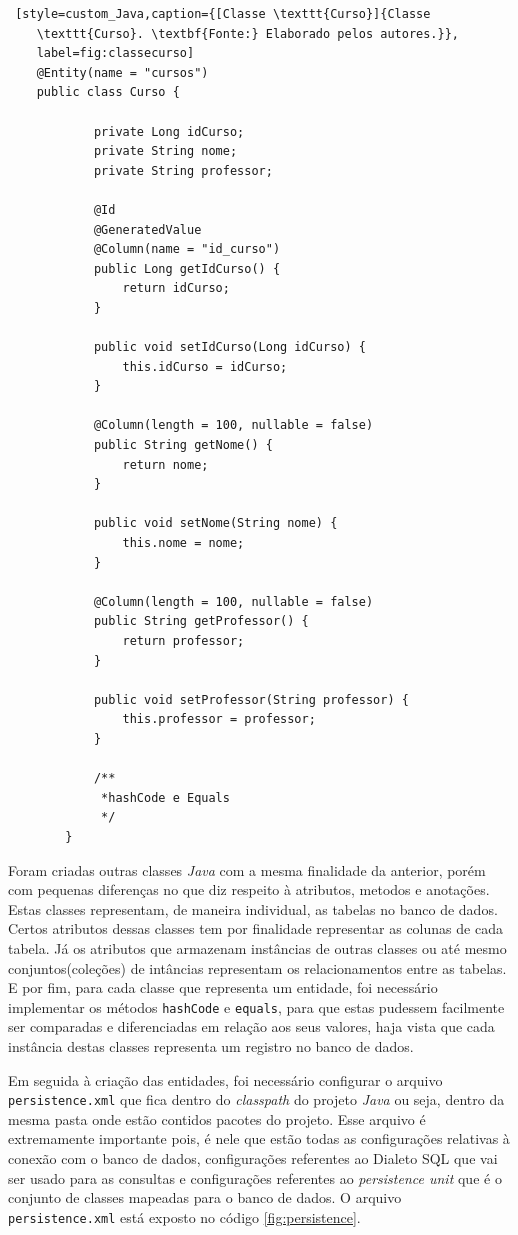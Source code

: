 	\begin{lstlisting} [style=custom_Java,caption={[Classe \texttt{Curso}]{Classe
	\texttt{Curso}. \textbf{Fonte:} Elaborado pelos autores.}},
	label=fig:classecurso] 
	@Entity(name = "cursos") 
	public class Curso {

			private Long idCurso;
			private String nome;
			private String professor;
		
			@Id
			@GeneratedValue
			@Column(name = "id_curso")
			public Long getIdCurso() {
				return idCurso;
			}
		
			public void setIdCurso(Long idCurso) {
				this.idCurso = idCurso;
			}
		
			@Column(length = 100, nullable = false)
			public String getNome() {
				return nome;
			}
		
			public void setNome(String nome) {
				this.nome = nome;
			}
		
			@Column(length = 100, nullable = false)
			public String getProfessor() {
				return professor;
			}
		
			public void setProfessor(String professor) {
				this.professor = professor;
			}
			
			/**
			 *hashCode e Equals
			 */
		}
	\end{lstlisting}
	
		\par Foram criadas outras classes \textit{Java} com a mesma finalidade da
	anterior, porém com pequenas diferenças no que diz respeito à atributos,
	metodos e anotações. Estas classes representam, de maneira individual, as
	tabelas no banco de dados. Certos atributos dessas classes tem por finalidade
	representar as colunas de cada tabela. Já os atributos que armazenam instâncias
	de outras classes ou até mesmo conjuntos(coleções) de intâncias representam os
	relacionamentos entre as tabelas. E por fim, para cada classe que representa um
	entidade, foi necessário implementar os métodos \texttt{hashCode} e
	\texttt{equals}, para que estas pudessem facilmente ser comparadas e
	diferenciadas em relação aos seus valores, haja vista que cada instância
	destas classes representa um registro no banco de dados.
		
		\par Em seguida à criação das entidades, foi necessário configurar o arquivo
	\texttt{persistence.xml} que fica dentro do \textit{classpath} do projeto
	\textit{Java} ou seja, dentro da mesma pasta onde estão contidos pacotes do
	projeto. Esse arquivo é extremamente importante pois, é nele que estão todas
	as configurações relativas à conexão com o banco de dados, configurações
	referentes ao Dialeto SQL que vai ser usado para as consultas e configurações
	referentes ao \textit{persistence unit} que é o conjunto de classes mapeadas
	para o banco de dados.	O arquivo \texttt{persistence.xml} está exposto no
	código \ref{fig:persistence}.
	
